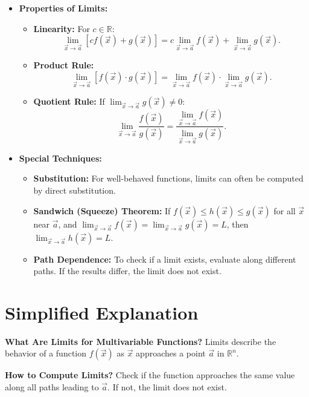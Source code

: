 \documentclass{article}
\begin{document}
\begin{itemize}
  \item \textbf{Properties of Limits:}
    \begin{itemize}
      \item \textbf{Linearity:} For $c \in \mathbb{R}$:
        \[
          \lim_{\vec{x} \to \vec{a}} [cf(\vec{x}) + g(\vec{x})] = c \lim_{\vec{x} \to \vec{a}} f(\vec{x}) + \lim_{\vec{x} \to \vec{a}} g(\vec{x}).
        \]
      \item \textbf{Product Rule:}
        \[
          \lim_{\vec{x} \to \vec{a}} [f(\vec{x}) \cdot g(\vec{x})] = \lim_{\vec{x} \to \vec{a}} f(\vec{x}) \cdot \lim_{\vec{x} \to \vec{a}} g(\vec{x}).
        \]
      \item \textbf{Quotient Rule:} If $\lim_{\vec{x} \to \vec{a}} g(\vec{x}) \neq 0$:
        \[
          \lim_{\vec{x} \to \vec{a}} \frac{f(\vec{x})}{g(\vec{x})} = \frac{\lim_{\vec{x} \to \vec{a}} f(\vec{x})}{\lim_{\vec{x} \to \vec{a}} g(\vec{x})}.
        \]
    \end{itemize}

  \item \textbf{Special Techniques:}
    \begin{itemize}
      \item \textbf{Substitution:} For well-behaved functions, limits can often be computed by direct substitution.
      \item \textbf{Sandwich (Squeeze) Theorem:} If $f(\vec{x}) \leq h(\vec{x}) \leq g(\vec{x})$ for all $\vec{x}$ near $\vec{a}$, and $\lim_{\vec{x} \to \vec{a}} f(\vec{x}) = \lim_{\vec{x} \to \vec{a}} g(\vec{x}) = L$, then $\lim_{\vec{x} \to \vec{a}} h(\vec{x}) = L$.
      \item \textbf{Path Dependence:} To check if a limit exists, evaluate along different paths. If the results differ, the limit does not exist.
    \end{itemize}
\end{itemize}

\section*{Simplified Explanation}

\textbf{What Are Limits for Multivariable Functions?}
Limits describe the behavior of a function $f(\vec{x})$ as $\vec{x}$ approaches a point $\vec{a}$ in $\mathbb{R}^n$.

\textbf{How to Compute Limits?}
Check if the function approaches the same value along all paths leading to $\vec{a}$. If not, the limit does not exist.
\end{document}
